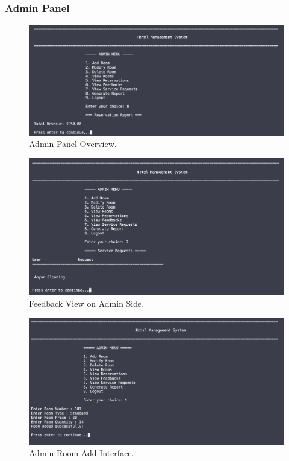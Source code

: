 \documentclass[12pt,a4paper]{article}
\begin{document}
\subsubsection{Admin Panel}
\begin{figure}[!htbp]
    \centering
    \includegraphics[width=\linewidth]{admin.png} %
    \caption{Admin Panel Overview.}
\end{figure}

\begin{figure}[!htbp]
    \centering
    \includegraphics[width=\linewidth]{admin-service.png} %
    \caption{Feedback View on Admin Side.}
\end{figure}

\begin{figure}[!htbp]
    \centering
    \includegraphics[width=\linewidth]{room_add.png} %
    \caption{Admin Room Add Interface.}
\end{figure}
\end{document}
